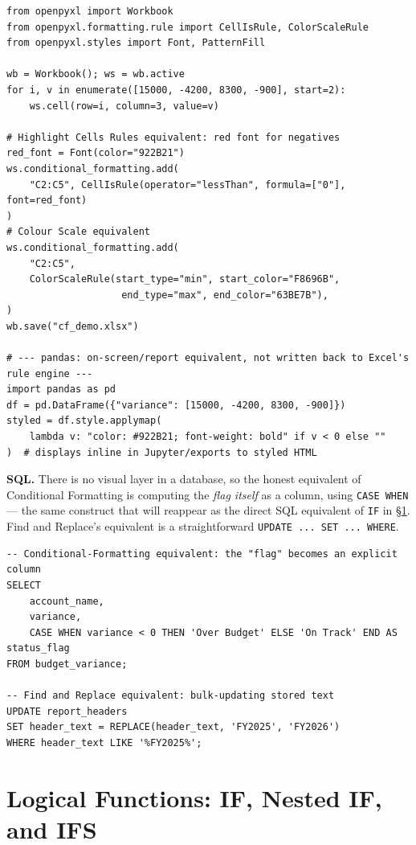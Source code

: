 \documentclass[11pt,a4paper]{article}
\begin{document}
\begin{lstlisting}[style=pythonstyle, caption={Both flavours: a live openpyxl rule for the .xlsx file, and a one-off pandas.style view for analysis}]
from openpyxl import Workbook
from openpyxl.formatting.rule import CellIsRule, ColorScaleRule
from openpyxl.styles import Font, PatternFill

wb = Workbook(); ws = wb.active
for i, v in enumerate([15000, -4200, 8300, -900], start=2):
    ws.cell(row=i, column=3, value=v)

# Highlight Cells Rules equivalent: red font for negatives
red_font = Font(color="922B21")
ws.conditional_formatting.add(
    "C2:C5", CellIsRule(operator="lessThan", formula=["0"], font=red_font)
)
# Colour Scale equivalent
ws.conditional_formatting.add(
    "C2:C5",
    ColorScaleRule(start_type="min", start_color="F8696B",
                    end_type="max", end_color="63BE7B"),
)
wb.save("cf_demo.xlsx")

# --- pandas: on-screen/report equivalent, not written back to Excel's rule engine ---
import pandas as pd
df = pd.DataFrame({"variance": [15000, -4200, 8300, -900]})
styled = df.style.applymap(
    lambda v: "color: #922B21; font-weight: bold" if v < 0 else ""
)  # displays inline in Jupyter/exports to styled HTML
\end{lstlisting}

\textbf{SQL.} There is no visual layer in a database, so the honest equivalent of Conditional Formatting is computing the \emph{flag itself} as a column, using \texttt{CASE WHEN} --- the same construct that will reappear as the direct SQL equivalent of \texttt{IF} in \S\ref{sec:iffunctions}. Find and Replace's equivalent is a straightforward \texttt{UPDATE ... SET ... WHERE}.

\begin{lstlisting}[style=sqlstyle, caption={Computing a CF-equivalent flag column, and a Find/Replace-equivalent UPDATE}]
-- Conditional-Formatting equivalent: the "flag" becomes an explicit column
SELECT
    account_name,
    variance,
    CASE WHEN variance < 0 THEN 'Over Budget' ELSE 'On Track' END AS status_flag
FROM budget_variance;

-- Find and Replace equivalent: bulk-updating stored text
UPDATE report_headers
SET header_text = REPLACE(header_text, 'FY2025', 'FY2026')
WHERE header_text LIKE '%FY2025%';
\end{lstlisting}

\section{Logical Functions: IF, Nested IF, and IFS}
\label{sec:iffunctions}
\end{document}
